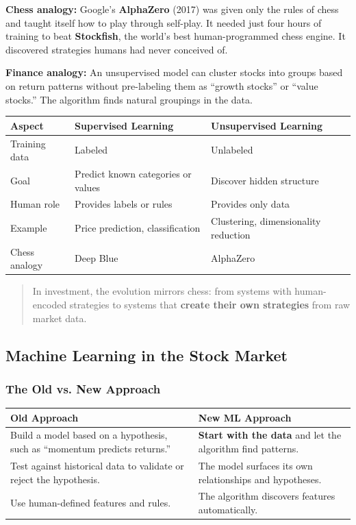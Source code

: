 \documentclass[12pt,openany]{book}
\begin{document}
\textbf{Chess analogy:} Google's \textbf{AlphaZero} (2017) was given only the rules of chess and taught itself how to play through self-play. It needed just four hours of training to beat \textbf{Stockfish}, the world's best human-programmed chess engine. It discovered strategies humans had never conceived of.

\textbf{Finance analogy:} An unsupervised model can cluster stocks into groups based on return patterns without pre-labeling them as ``growth stocks'' or ``value stocks.'' The algorithm finds natural groupings in the data.

\begin{center}
\scriptsize
\setlength{\tabcolsep}{3pt}
\begin{tabular}{|L{3.0cm}|L{4.6cm}|L{4.6cm}|}
\hline
\textbf{Aspect} & \textbf{Supervised Learning} & \textbf{Unsupervised Learning} \\
\hline
Training data & Labeled & Unlabeled \\
\hline
Goal & Predict known categories or values & Discover hidden structure \\
\hline
Human role & Provides labels or rules & Provides only data \\
\hline
Example & Price prediction, classification & Clustering, dimensionality reduction \\
\hline
Chess analogy & Deep Blue & AlphaZero \\
\hline
\end{tabular}
\end{center}

\begin{quote}
In investment, the evolution mirrors chess: from systems with human-encoded strategies to systems that \textbf{create their own strategies} from raw market data.
\end{quote}

\subsection{Machine Learning in the Stock Market}

\subsubsection{The Old vs. New Approach}

\begin{center}
\scriptsize
\setlength{\tabcolsep}{3pt}
\begin{tabular}{|L{5.8cm}|L{5.8cm}|}
\hline
\textbf{Old Approach} & \textbf{New ML Approach} \\
\hline
Build a model based on a hypothesis, such as ``momentum predicts returns.'' & \textbf{Start with the data} and let the algorithm find patterns. \\
\hline
Test against historical data to validate or reject the hypothesis. & The model surfaces its own relationships and hypotheses. \\
\hline
Use human-defined features and rules. & The algorithm discovers features automatically. \\
\hline
\end{tabular}
\end{center}
\end{document}
